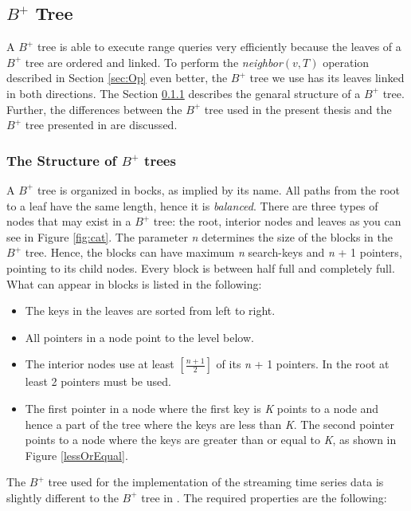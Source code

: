 \documentclass[abstracton,12pt]{scrreprt}
\begin{document}
\subsection{$B^+$ Tree}
A $B^+$ tree is able to execute range queries very efficiently because the leaves of a $B^+$ tree are ordered and linked. To perform the \emph{neighbor}$(v,T)$ operation described in Section \ref{sec:Op} even better, the $B^+$ tree we use has its leaves linked in both directions. The Section \ref{structureBtree} describes the genaral structure of a $B^+$ tree. Further, the differences between the $B^+$ tree used in the present thesis and the $B^+$ tree presented in \cite{BTreeBook} are discussed. 

\subsubsection{The Structure of $B^+$ trees}
\label{structureBtree}
A $B^+$ tree is organized in bocks, as implied by its name. All paths from the root to a leaf have the same length, hence it is \emph{balanced}. There are three types of nodes that may exist in a $B^+$ tree: the root, interior nodes and leaves as you can see in Figure \ref{fig:cat}. The parameter \emph{n} determines the size of the blocks in the $B^+$ tree. Hence, the blocks can have maximum \emph{n} search-keys and \emph{n} + 1 pointers, pointing to its child nodes. Every block is between half full and completely full. What can appear in blocks is listed in the following: \\
\begin{itemize}  
	\item The keys in the leaves are sorted from left to right. 
	\item All pointers in a node point to the level below.
	\item The interior nodes use at least $[\frac{n+1}{2}]$ of its \emph{n} + 1 pointers. In the root at least 2 pointers must be used. 
	\item The first pointer in a node where the first key is \emph{K} points to a node and hence a part of the tree where the keys are less than \emph{K}. The second pointer points to a node where the keys are greater than or equal to \emph{K}, as shown in Figure \ref{lessOrEqual}. \\
\end{itemize}
The $B^+$ tree used for the implementation of the streaming time series data is slightly different to the  $B^+$ tree in \cite{BTreeBook}. The required properties are the following: \\
\end{document}
